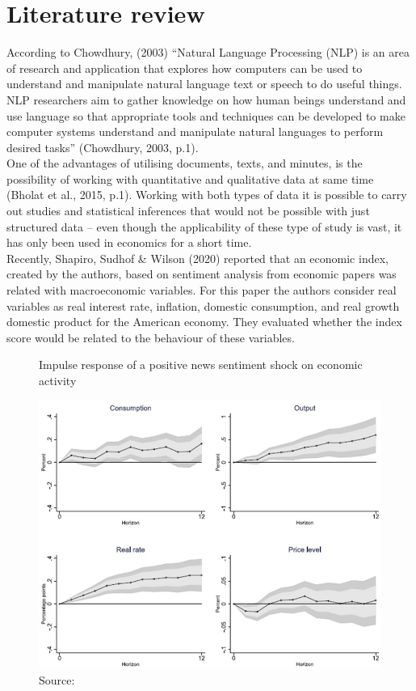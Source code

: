 \chapter{\textbf{Literature review}}  \label{chapter:lit}

According to Chowdhury, (2003) “Natural Language Processing (NLP) is an area of research and application that explores how computers can be used to understand and manipulate natural language text or speech to do useful things. NLP researchers aim to gather knowledge on how human beings understand and use language so that appropriate tools and techniques can be developed to make computer systems understand and manipulate natural languages to perform desired tasks” (Chowdhury, 2003, p.1).\\

One of the advantages of utilising documents, texts, and minutes, is the possibility of working with quantitative and qualitative data at same time (Bholat et al., 2015, p.1). Working with both types of data it is possible to carry out studies and statistical inferences that would not be possible with just structured data – even though the applicability of these type of study is vast, it has only been used in economics for a short time.\\

Recently, Shapiro, Sudhof \& Wilson (2020) reported that an economic index, created by the authors, based on sentiment analysis from economic papers was related with macroeconomic variables. For this paper the authors consider real variables as real interest rate, inflation, domestic consumption, and real growth domestic product for the American economy. They evaluated whether the index score would be related to the behaviour of these variables.

\begin{figure}[!h]
    \centering
    \caption{Impulse response of a positive news sentiment shock on economic activity}
    \includegraphics[width=.8\textwidth]{images/image1.jpg}
    \caption*{Source: \cite[p.16]{shapiro2020measuring}}
    \label{fig:my_label}
\end{figure}

